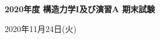 \documentclass[10pt,a4j]{jarticle}
\newlength{\minitwocolumn}
\begin{document}
\newcommand{\fat}[1]{\mbox{\boldmath $#1$}}
\newcommand{\D}{\partial}
\newcommand{\w}{\omega}
\newcommand{\ga}{\alpha}
\newcommand{\gb}{\beta}
\newcommand{\gx}{\xi}
\newcommand{\gz}{\zeta}
\newcommand{\vhat}[1]{\hat{\fat{#1}}}
\newcommand{\spc}{\vspace{0.7\baselineskip}}
\newcommand{\halfspc}{\vspace{0.3\baselineskip}}

\newcommand{\twofig}[2]
 {
   \begin{figure}[here]
     \begin{minipage}[t]{\minitwocolumn}
         \begin{center}   #1
         \end{center}
     \end{minipage}
         \hspace{\columnsep}
     \begin{minipage}[t]{\minitwocolumn}
         \begin{center} #2
         \end{center}
     \end{minipage}
   \end{figure}
 }
\begin{center}
{\Large \bf 2020年度 構造力学I及び演習A 期末試験} \\
\end{center}
\begin{flushright}
	2020年11月24日(火)
\end{flushright}
%
%
%
\end{document}
